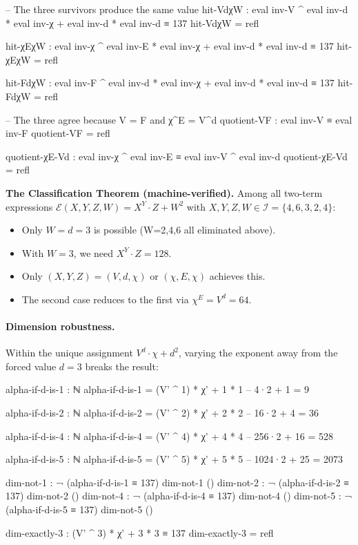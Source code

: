 \documentclass[11pt,a4paper]{article}
\begin{document}
\begin{code}
-- The three survivors produce the same value
hit-VdχW : eval inv-V ^ eval inv-d * eval inv-χ + eval inv-d * eval inv-d ≡ 137
hit-VdχW = refl

hit-χEχW : eval inv-χ ^ eval inv-E * eval inv-χ + eval inv-d * eval inv-d ≡ 137
hit-χEχW = refl

hit-FdχW : eval inv-F ^ eval inv-d * eval inv-χ + eval inv-d * eval inv-d ≡ 137
hit-FdχW = refl

-- The three agree because V = F and χ^E = V^d
quotient-VF : eval inv-V ≡ eval inv-F
quotient-VF = refl

quotient-χE-Vd : eval inv-χ ^ eval inv-E ≡ eval inv-V ^ eval inv-d
quotient-χE-Vd = refl
\end{code}

\textbf{The Classification Theorem (machine-verified).}
Among all two-term expressions $\mathcal{E}(X,Y,Z,W) = X^Y \cdot Z + W^2$
with $X,Y,Z,W \in \mathcal{I} = \{4,6,3,2,4\}$:
\begin{itemize}
\item Only $W = d = 3$ is possible (W=2,4,6 all eliminated above).
\item With $W = 3$, we need $X^Y \cdot Z = 128$.
\item Only $(X,Y,Z) = (V,d,\chi)$ or $(\chi,E,\chi)$ achieves this.
\item The second case reduces to the first via $\chi^E = V^d = 64$.
\end{itemize}


\paragraph{Dimension robustness.}
Within the unique assignment $V^d \cdot \chi + d^2$, varying the exponent
away from the forced value $d = 3$ breaks the result:

\begin{code}
alpha-if-d-is-1 : ℕ
alpha-if-d-is-1 = (V' ^ 1) * χ' + 1 * 1   -- 4·2 + 1 = 9

alpha-if-d-is-2 : ℕ
alpha-if-d-is-2 = (V' ^ 2) * χ' + 2 * 2   -- 16·2 + 4 = 36

alpha-if-d-is-4 : ℕ
alpha-if-d-is-4 = (V' ^ 4) * χ' + 4 * 4   -- 256·2 + 16 = 528

alpha-if-d-is-5 : ℕ
alpha-if-d-is-5 = (V' ^ 5) * χ' + 5 * 5   -- 1024·2 + 25 = 2073

dim-not-1 : ¬ (alpha-if-d-is-1 ≡ 137)
dim-not-1 ()
dim-not-2 : ¬ (alpha-if-d-is-2 ≡ 137)
dim-not-2 ()
dim-not-4 : ¬ (alpha-if-d-is-4 ≡ 137)
dim-not-4 ()
dim-not-5 : ¬ (alpha-if-d-is-5 ≡ 137)
dim-not-5 ()

dim-exactly-3 : (V' ^ 3) * χ' + 3 * 3 ≡ 137
dim-exactly-3 = refl
\end{code}
\end{document}
